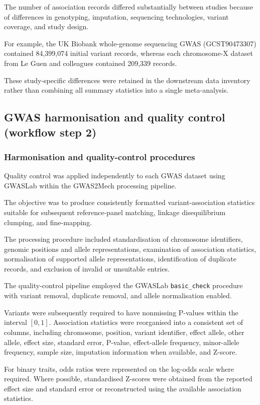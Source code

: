 \documentclass[11pt,a4paper]{article}
\begin{document}
The number of association records differed substantially
between studies because of differences in genotyping,
imputation, sequencing technologies, variant coverage,
and study design.

For example, the UK Biobank whole-genome sequencing
GWAS (GCST90473307) contained 84,399,074 initial
variant records, whereas each chromosome-X dataset
from Le Guen and colleagues contained 209,339 records.

These study-specific differences were retained in the
downstream data inventory rather than combining all
summary statistics into a single meta-analysis.


\subsection{GWAS harmonisation and quality control (workflow step 2)}
\label{sec:gwas_qc}

\subsubsection{Harmonisation and quality-control procedures}

Quality control was applied independently to each GWAS
dataset using GWASLab within the GWAS2Mech processing
pipeline.

The objective was to produce consistently formatted
variant-association statistics suitable for subsequent
reference-panel matching, linkage disequilibrium
clumping, and fine-mapping.

The processing procedure included standardisation of
chromosome identifiers, genomic positions and allele
representations, examination of association statistics,
normalisation of supported allele representations,
identification of duplicate records, and exclusion of
invalid or unsuitable entries.

The quality-control pipeline employed the GWASLab
\texttt{basic\_check} procedure with variant removal,
duplicate removal, and allele normalisation enabled.

Variants were subsequently required to have nonmissing
P-values within the interval $[0,1]$. Association
statistics were reorganised into a consistent set of
columns, including chromosome, position, variant
identifier, effect allele, other allele, effect size,
standard error, P-value, effect-allele frequency,
minor-allele frequency, sample size, imputation
information when available, and Z-score.

For binary traits, odds ratios were represented on the
log-odds scale where required. Where possible,
standardised Z-scores were obtained from the reported
effect size and standard error or reconstructed using
the available association statistics.
\end{document}
